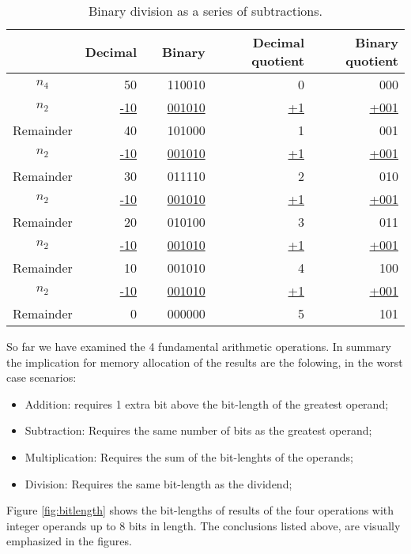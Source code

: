 \documentclass[12pt]{article}
\begin{document}
\begin{table}[ht]
	\centering
    \caption{Binary division as a series of subtractions.}
    \begin{tabular}{crrrrr}
    \hline
    	  & Decimal & & Binary & Decimal quotient & Binary quotient\\
    \hline  
    $n_4$ & 50 					& & 110010
&0& 000 \\
    $n_2$ & \underline{-10} 	& & \underline{001010}  &\underline{+1}&
\underline{+001} \\
    Remainder & 40      			& & 101000
&1& 001
\\
    $n_2$ & \underline{-10} 	& & \underline{001010}  &\underline{+1}&
\underline{+001} \\
    Remainder & 30      			& & 011110
&2& 010
\\
    $n_2$ & \underline{-10} 	& & \underline{001010}  &\underline{+1}&
\underline{+001} \\
    Remainder & 20      			& & 010100
&3& 011
\\
    $n_2$ & \underline{-10} 	& & \underline{001010}  &\underline{+1}&
\underline{+001} \\
    Remainder & 10      			& & 001010
&4& 100
\\
    $n_2$ & \underline{-10} 	& & \underline{001010}  &\underline{+1}&
\underline{+001} \\
    Remainder & 0      				& & 000000
&5& 101 \\
    \hline
	\end{tabular}
    \label{tab:08}
\end{table}

So far we have examined the 4 fundamental arithmetic operations. In summary the
implication for memory allocation of the results are the folowing, in the worst
case scenarios:

\begin{itemize}
\item Addition: requires 1 extra bit above the bit-length of the greatest
operand;
\item Subtraction: Requires the same number of bits as the greatest
operand;
\item Multiplication: Requires the sum of the bit-lenghts of the
operands;
\item Division: Requires the same bit-length as the dividend;
\end{itemize}

Figure \ref{fig:bitlength} shows the bit-lengths of results of the four
operations with integer operands up to 8 bits in length. The conclusions listed
above, are visually emphasized in the figures.
\end{document}
